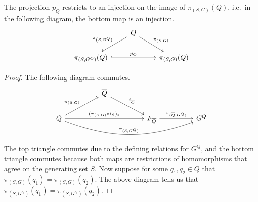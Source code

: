 \begin{lemma}
	\label{lem:injectivity_of_P_Q_on_Q}
	The projection $p_Q$ restricts to an injection on the image of  $\pi_{(S,G)}(Q)$, i.e.~in the following diagram, the bottom map is an injection.
	\begin{equation*}
		\begin{tikzcd}
			& Q \ar[dl, "\pi_{\left(S,G^Q\right)}"'] \ar[dr, "\pi_{\left(S,G\right)}"] &
			\\ \pi_{\left( S,G^Q \right)} (Q) \ar[rr, hook, "p_Q"]  & & \pi_{\left( S,G \right)}(Q)
		\end{tikzcd}
	\end{equation*}
\end{lemma}
\begin{proof}
	The following diagram commutes.
	\begin{equation*}
		\begin{tikzcd}
			&& {\overline{Q}} \\
			Q &&&& {F_{\overline{Q}}} && {G^Q}
			\arrow["{i_{\overline{Q}}}", from=1-3, to=2-5]
			\arrow["{\pi_{(S,G)}}", from=2-1, to=1-3]
			\arrow["{(\pi_{(S,G)} \circ i_S)_*}", from=2-1, to=2-5]
			\arrow["{\pi_{(S,G^Q)}}", bend right=20, from=2-1, to=2-7]
			\arrow["{\pi_{(\overline{Q},G^Q)}}", from=2-5, to=2-7]
		\end{tikzcd}
	\end{equation*}
	The top triangle commutes due to the defining relations for $G^Q$, and the bottom triangle commutes because both maps are restrictions of homomorphisms that agree on the generating set $S$.
	Now suppose for some $q_1,q_2 \in Q$ that $\pi_{(S,G)}(q_1)=\pi_{(S,G)}(q_2)$.
	The above diagram tells us that $\pi_{(S,G^Q)}(q_1) = \pi_{(S,G^Q)}(q_2)$.
\end{proof}

